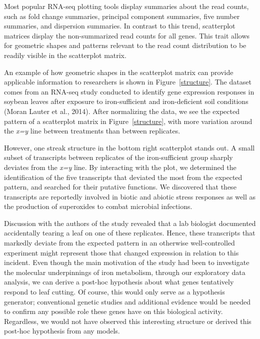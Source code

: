 \documentclass[referee]{biom}
\begin{document}
Most popular RNA-seq plotting tools display summaries about the read counts, such as fold change summaries, principal component summaries, five number summaries, and dispersion summaries. In contrast to this trend, scatterplot matrices display the non-summarized read counts for all genes. This trait allows for geometric shapes and patterns relevant to the read count distribution to be readily visible in the scatterplot matrix.

An example of how geometric shapes in the scatterplot matrix can provide applicable information to researchers is shown in Figure~\ref{structure}. The dataset comes from an RNA-seq study conducted to identify gene expression responses in soybean leaves after exposure to iron-sufficient and iron-deficient soil conditions (Moran Lauter et al., 2014). After normalizing the data, we see the expected pattern of a scatterplot matrix in Figure~\ref{structure}, with more variation around the \textit{x=y} line between treatments than between replicates. 

However, one streak structure in the bottom right scatterplot stands out. A small subset of transcripts between replicates of the iron-sufficient group sharply deviates from the \textit{x=y} line. By interacting with the plot, we determined the identification of the five transcripts that deviated the most from the expected pattern, and searched for their putative functions. We discovered that these transcripts are reportedly involved in biotic and abiotic stress responses as well as the production of superoxides to combat microbial infections.

Discussion with the authors of the study revealed that a lab biologist documented accidentally tearing a leaf on one of these replicates. Hence, these transcripts that markedly deviate from the expected pattern in an otherwise well-controlled experiment might represent those that changed expression in relation to this incident. Even though the main motivation of the study had been to investigate the molecular underpinnings of iron metabolism, through our exploratory data analysis, we can derive a post-hoc hypothesis about what genes tentatively respond to leaf cutting. Of course, this would only serve as a hypothesis generator; conventional genetic studies and additional evidence would be needed to confirm any possible role these genes have on this biological activity. Regardless, we would not have observed this interesting structure or derived this post-hoc hypothesis from any models.
\end{document}
